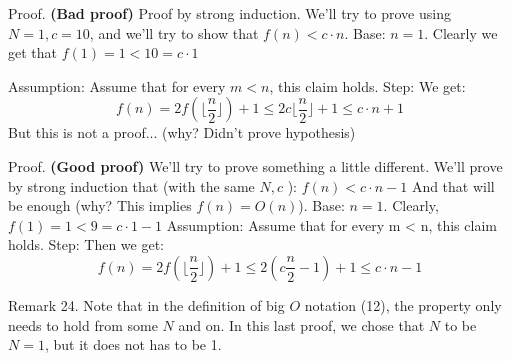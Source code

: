 Proof. \textbf{(Bad proof)}
Proof by strong induction. We’ll try to prove using \(N = 1, c = 10\), and we’ll try to show that \(f(n) < c \cdot n\).
Base: \(n = 1\). Clearly we get that \(f(1) = 1 < 10 = c \cdot 1\)

Assumption: Assume that for every \(m < n\), this claim holds.
Step: We get:
\begin{equation*}
    f(n) = 2f\left( \lfloor  \frac{n}{2} \rfloor \right) + 1 \le 2c\lfloor  \frac{n}{2} \rfloor  + 1 \le c\cdot n + 1
\end{equation*}
But this is not a proof... (why? Didn’t prove hypothesis)


Proof. \textbf{(Good proof)} We’ll try to prove something a little different. We’ll prove by strong induction that (with the same \(N, c\) ): \(f(n) < c \cdot n - 1\) And that will be enough (why? This implies \(f(n) = O(n)\)).
Base: \(n = 1\). Clearly, \(f(1) = 1 < 9 = c \cdot 1 - 1\)
Assumption: Assume that for every m < n, this claim holds.
Step: Then we get:
\begin{equation*}
    f(n) = 2f\left( \lfloor  \frac{n}{2} \rfloor \right) + 1 \le 2\left(c  \frac{n}{2} -1 \right)  + 1 \le c\cdot n - 1
\end{equation*}

Remark 24. Note that in the definition of big \(O\) notation (12), the property only needs to hold from some \(N\) and on. In this
last proof, we chose that \(N\) to be \(N = 1\), but it does not has to be 1.




